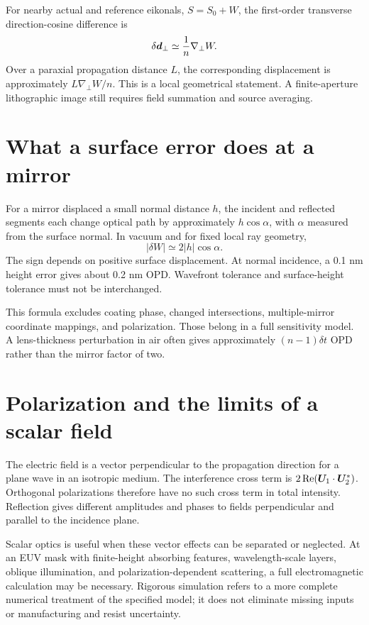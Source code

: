 For nearby actual and reference eikonals, $S=S_0+W$, the first-order
transverse direction-cosine difference is
\begin{equation}
\delta\bm{d}_\perp\simeq\frac{1}{n}\nabla_\perp W.
\label{eq:raygradient}
\end{equation}
Over a paraxial propagation distance $L$, the corresponding displacement
is approximately $L\nabla_\perp W/n$. This is a local geometrical statement.
A finite-aperture lithographic image still requires field summation and
source averaging.


\section{What a surface error does at a mirror}
For a mirror displaced a small normal distance $h$, the incident and
reflected segments each change optical path by approximately
$h\cos\alpha$, with $\alpha$ measured from the surface normal.
In vacuum and for fixed local ray geometry,
\begin{equation}
|\delta W|\simeq2|h|\cos\alpha.
\label{eq:mirror}
\end{equation}
The sign depends on positive surface displacement. At normal incidence,
a 0.1 nm height error gives about 0.2 nm OPD. Wavefront tolerance and
surface-height tolerance must not be interchanged.

This formula excludes coating phase, changed intersections, multiple-mirror
coordinate mappings, and polarization. Those belong in a full sensitivity
model. A lens-thickness perturbation in air often gives approximately
$(n-1)\delta t$ OPD rather than the mirror factor of two.

\section{Polarization and the limits of a scalar field}
The electric field is a vector perpendicular to the propagation direction
for a plane wave in an isotropic medium. The interference cross term is
$2\operatorname{Re}(\bm{U}_1\cdot\bm{U}_2^*)$. Orthogonal polarizations therefore have
no such cross term in total intensity. Reflection gives different
amplitudes and phases to fields perpendicular and parallel to the
incidence plane.

Scalar optics is useful when these vector effects can be separated or
neglected. At an EUV mask with finite-height absorbing features,
wavelength-scale layers, oblique illumination, and polarization-dependent
scattering, a full electromagnetic calculation may be necessary.
Rigorous simulation refers to a more complete numerical treatment of the
specified model; it does not eliminate missing inputs or manufacturing
and resist uncertainty.
